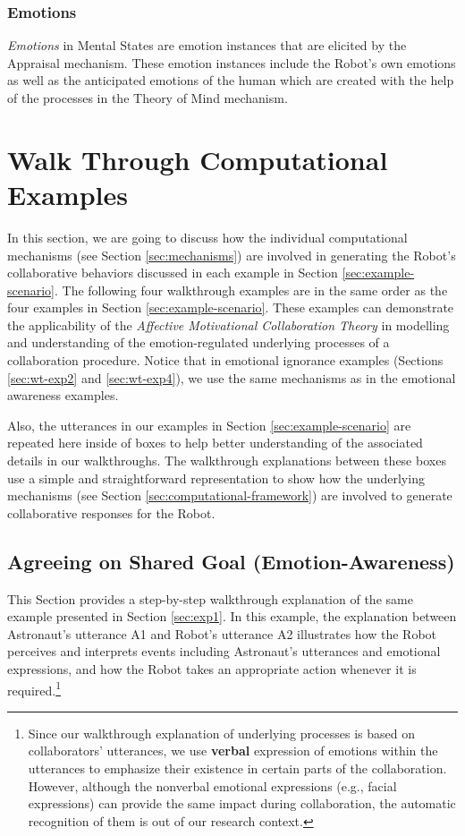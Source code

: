 \subsubsection{Emotions}

\textit{Emotions} in Mental States are emotion instances that are elicited by
the Appraisal mechanism. These emotion instances include the Robot's own
emotions as well as the anticipated emotions of the human which are created with
the help of the processes in the Theory of Mind mechanism.

\section{Walk Through Computational Examples}
\label{sec:wtce}

In this section, we are going to discuss how the individual computational
mechanisms (see Section \ref{sec:mechanisms}) are involved in generating the
Robot's collaborative behaviors discussed in each example in Section
\ref{sec:example-scenario}. The following four walkthrough examples are in the
same order as the four examples in Section \ref{sec:example-scenario}. These
examples can demonstrate the applicability of the \textit{Affective Motivational
Collaboration Theory} in modelling and understanding of the emotion-regulated
underlying processes of a collaboration procedure. Notice that in emotional
ignorance examples (Sections \ref{sec:wt-exp2} and \ref{sec:wt-exp4}), we use
the same mechanisms as in the emotional awareness examples.

Also, the utterances in our examples in Section \ref{sec:example-scenario} are
repeated here inside of boxes to help better understanding of the associated
details in our walkthroughs. The walkthrough explanations between these boxes
use a simple and straightforward representation to show how the underlying
mechanisms (see Section \ref{sec:computational-framework}) are involved to
generate collaborative responses for the Robot.

\subsection{Agreeing on Shared Goal (Emotion-Awareness)}
\label{sec:wt-exp1}

This Section provides a step-by-step walkthrough explanation of the same
example presented in Section \ref{sec:exp1}. In this example, the explanation
between Astronaut's utterance A1 and Robot's utterance A2 illustrates how the
Robot perceives and interprets events including Astronaut's utterances and
emotional expressions, and how the Robot takes an appropriate action whenever it
is required.\footnote{Since our walkthrough explanation of underlying processes
is based on collaborators' utterances, we use \textbf{verbal} expression of
emotions within the utterances to emphasize their existence in certain parts of
the collaboration. However, although the nonverbal emotional expressions (e.g.,
facial expressions) can provide the same impact during collaboration, the
automatic recognition of them is out of our research context.}\\


